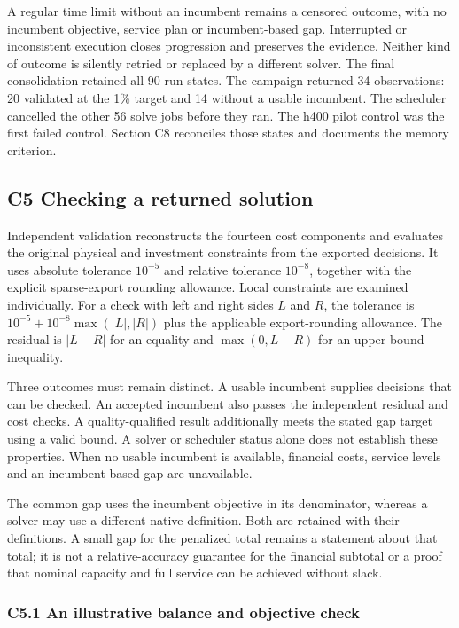 \documentclass[
  english,
  11pt,
  a4paper,
]{article}
\begin{document}
A regular time limit without an incumbent remains a censored outcome,
with no incumbent objective, service plan or incumbent-based gap.
Interrupted or inconsistent execution closes progression and preserves
the evidence. Neither kind of outcome is silently retried or replaced by
a different solver. The final consolidation retained all 90 run states.
The campaign returned 34 observations: 20 validated at the 1\% target
and 14 without a usable incumbent. The scheduler cancelled the other 56
solve jobs before they ran. The h400 pilot control was the first failed
control. Section C8 reconciles those states and documents the memory
criterion.

\subsection{C5 Checking a returned
solution}\label{c5-checking-a-returned-solution}

Independent validation reconstructs the fourteen cost components and
evaluates the original physical and investment constraints from the
exported decisions. It uses absolute tolerance \(10^{-5}\) and relative
tolerance \(10^{-8}\), together with the explicit sparse-export rounding
allowance. Local constraints are examined individually. For a check with
left and right sides \(L\) and \(R\), the tolerance is
\(10^{-5}+10^{-8}\max(|L|,|R|)\) plus the applicable export-rounding
allowance. The residual is \(|L-R|\) for an equality and \(\max(0,L-R)\)
for an upper-bound inequality.

Three outcomes must remain distinct. A usable incumbent supplies
decisions that can be checked. An accepted incumbent also passes the
independent residual and cost checks. A quality-qualified result
additionally meets the stated gap target using a valid bound. A solver
or scheduler status alone does not establish these properties. When no
usable incumbent is available, financial costs, service levels and an
incumbent-based gap are unavailable.

The common gap uses the incumbent objective in its denominator, whereas
a solver may use a different native definition. Both are retained with
their definitions. A small gap for the penalized total remains a
statement about that total; it is not a relative-accuracy guarantee for
the financial subtotal or a proof that nominal capacity and full service
can be achieved without slack.

\subsubsection{C5.1 An illustrative balance and objective
check}\label{an-illustrative-balance-and-objective-check}
\end{document}
